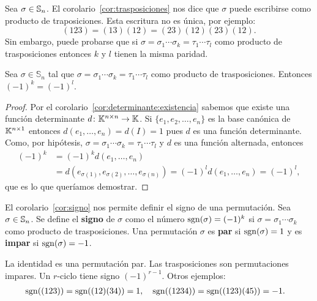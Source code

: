 \begin{block}
    Sea $\sigma\in\mathbb{S}_n$. El corolario~\ref{cor:trasposiciones} nos dice que
    $\sigma$ puede escribirse como producto de traposiciones. Esta escritura no
    es única, por ejemplo:
    \[
        (123)=(13)(12)=(23)(12)(23)(12).
    \]
	Sin embargo, puede probarse que si
	$\sigma=\sigma_1\cdots\sigma_k=\tau_1\cdots\tau_l$ como producto de
	trasposiciones entonces $k$ y $l$ tienen la misma paridad.  
\end{block}

\begin{cor}
    \label{cor:signo}
    Sea $\sigma\in\mathbb{S}_{n}$ tal que
    $\sigma=\sigma_{1}\cdots\sigma_{k}=\tau_{1}\cdots\tau_{l}$ como producto de
    trasposiciones. Entonces $(-1)^{k}=(-1)^{l}$.

    \begin{proof}
		Por el corolario~\ref{cor:determinante:existencia} sabemos que existe
		una función determinante $d\colon\mathbb{K}^{n\times n}\to\mathbb{K}$. Si
		$\{e_1,e_2,\dots,e_n\}$ es la base canónica de $\mathbb{K}^{n\times 1}$
		entonces $d(e_1,\dots,e_n)=d(I)=1$ pues $d$ es una función
		determinante.  Como, por hipótesis,
		$\sigma=\sigma_1\cdots\sigma_k=\tau_1\cdots\tau_l$ y $d$ es una función
		alternada, entonces 
        \begin{align*}
            (-1)^k&=(-1)^kd(e_1,\dots,e_n)\\
            &=d(e_{\sigma(1)},e_{\sigma(2)},\dots,e_{\sigma(n)})=(-1)^ld(e_1,\dots,e_n)=(-1)^l,
        \end{align*}
        que es lo que queríamos demostrar.
    \end{proof}
\end{cor}

\begin{block}
	El corolario~\ref{cor:signo} nos permite definir el signo de una
	permutación.  Sea $\sigma\in\mathbb{S}_n$. Se define el \textbf{signo} de
	$\sigma$ como el número $\operatorname{sgn}(\sigma)=(-1)^k$ si
	$\sigma=\sigma_1\cdots\sigma_k$ como producto de trasposiciones. Una
	permutación $\sigma$ es \textbf{par} si $\operatorname{sgn}(\sigma)=1$ y es
	\textbf{impar} si $\operatorname{sgn}(\sigma)=-1$. 
\end{block}

\begin{examples}
	La identidad es una permutación par. Las trasposiciones son permutaciones
	impares.  Un $r$-ciclo tiene signo $(-1)^{r-1}$. Otros ejemplos: 
	\begin{align*}
	&\operatorname{sgn}((123))=
	\operatorname{sgn}((12)(34))=1,
	&&
	\operatorname{sgn}((1234))= 
	\operatorname{sgn}((123)(45))=-1.
\end{align*}
\end{examples}

